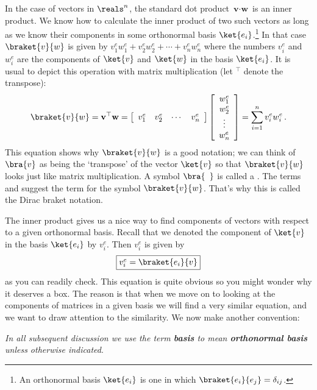 In the case of vectors in $\reals^n$, the standard dot product $\textbf{v}\cdot \textbf{w}$ is an inner product.
We know how to calculate the inner product of two such vectors as long as we know their components in some orthonormal basis $\ket{e_i}$.\footnote{An orthonormal basis $\ket{e_i}$ is one in which $\braket{e_i}{e_j} = \delta _{ij}$.}
In that case $\braket{v}{w}$ is given by $v^{e}_1 w^{e}_1 + v^{e}_2 w^{e}_2 + \cdots + v^{e}_n w^{e}_n$ where the numbers $v^{e}_i$ and $w^{e}_i$ are the components of $\ket{v}$ and $\ket{w}$ in the basis $\ket{e_i}$.
It is usual to depict this operation with matrix multiplication (let $^\top$ denote the transpose):
\begin{displaymath}
  \braket{v}{w}
  = \textbf{v}^\top \textbf{w}
  = \left[ \begin{array}{cccc}
  v^{e}_{1} & v^{e}_{2} & \cdots & v^{e}_{n} \end{array} \right]
  \left[ \begin{array}{c}
  w^{e}_1 \\ w^{e}_2 \\ \vdots \\ w^{e}_n \end{array} \right] 
  = \sum_{i=1}^{n} v_i^ew_i^e
  \, .
\end{displaymath}
This equation shows why $\braket{v}{w}$ is a good notation; we can think of $\bra{v}$ as being the `transpose' of the vector $\ket{v}$ so that $\braket{v}{w}$ looks just like matrix multiplication.
A symbol $\bra{\phantom{v}}$ is called a .
The terms  and  suggest the term  for the symbol $\braket{v}{w}$.
That's why this is called the Dirac braket notation.

The inner product gives us a nice way to find components of vectors with respect to a given orthonormal basis.
Recall that we denoted the component of $\ket{v}$ in the basis $\ket{e_i}$ by $v^e_i$.
Then $v^e_i$ is given by
\begin{equation} \label{eq:vectorcomp}
  \framebox{$v^{e}_i = \braket{e_i}{v}$}
\end{equation}
as you can readily check.
This equation is quite obvious so you might wonder why it deserves a box.
The reason is that when we move on to looking at the components of matrices in a given basis we will find a very similar equation, and we want to draw attention to the similarity.
We now make another convention:

\textit{In all subsequent discussion we use the term \emph{\textbf{basis}} to mean \emph{\textbf{orthonormal basis}} unless otherwise indicated}.

